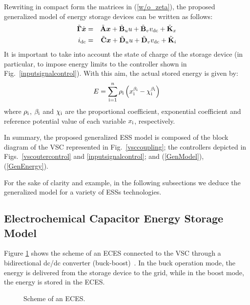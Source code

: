 \documentclass[journal, a4paper]{IEEEtran}
\begin{document}
Rewriting in compact form the matrices in (\ref{w/o_zeta}), the
proposed generalized model of energy storage devices can be written as
follows:
\begin{alignat}{3}
  \nonumber \tilde{\mathbf{\Gamma}}\dot{\boldsymbol{x}} &=&
  \tilde{\mathbf{A}}\boldsymbol{x} + \tilde{\mathbf{B}}_u
  u +
  \tilde{\mathbf{B}}_v v_{\rm dc} + \tilde{\mathbf{K}}_x\\
  i_{\rm dc} &=& \tilde{\mathbf{C}}\boldsymbol{x} +
  \tilde{\mathbf{D}}_u u + \tilde{\mathbf{D}}_v v_{\rm
    dc} + \tilde{\mathbf{K}}_i
  \label{GenModel}	
\end{alignat}
It is important to take into account the state of charge of the
storage device (in particular, to impose energy limits to the
controller shown in Fig.~\ref{inputsignalcontrol}). With this aim, 
the actual stored energy is given by:
\begin{equation}
  E = \sum_{\rm i=1}^{n} \rho_{\rm i} \left(x_{\rm i}^{\beta_{\rm i}} 
    - \chi_{\rm i}^{\beta_{\rm i}} \right) 
  \label{GenEnergy}
\end{equation}
where $\rho_{\rm i}$, $\beta_{\rm i}$ and $\chi_{\rm i}$ are the
proportional coefficient, exponential coefficient and reference
potential value of each variable $x_{\rm i}$, respectively.

In summary, the proposed generalized ESS model is composed of 
the block diagram of the VSC represented in Fig.~\ref{vsccoupling}; 
the controllers depicted in Figs.~\ref{vscoutercontrol} 
and \ref{inputsignalcontrol}; and (\ref{GenModel}), (\ref{GenEnergy}).

For the sake of clarity and example, in the following subsections we
deduce the generalized model for a variety of ESSs technologies.

\vspace{-2mm}
\subsection{Electrochemical Capacitor Energy Storage Model}
\label{subsec:sces}

Figure \ref{sces} shows the scheme of an ECES connected to the VSC through a bidirectional dc/dc converter
(buck-boost)~\cite{intham:13}.
In the buck operation mode, 
the energy is delivered from the storage device to the grid, 
while in the boost mode, the energy is stored in the ECES.
\begin{figure}[h!]
  \begin{center}
    \psfrag{+}{$+$}
    \psfrag{-}{$-$}
    \caption{Scheme of an ECES.}
    \label{sces}
  \end{center}
\vspace{-0.4cm}
\end{figure}
\end{document}
